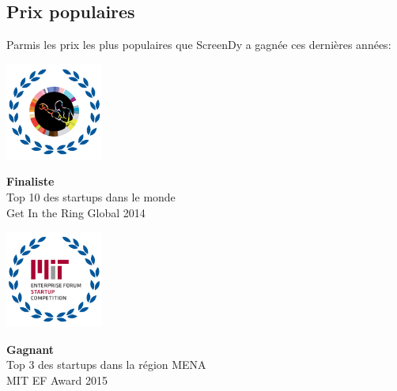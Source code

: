 \documentclass[12pt,a4paper]{report}
\begin{document}
		\subsection{Prix populaires}
Parmis les prix les plus populaires que ScreenDy a gagnée ces dernières années:\\
		\newline
		\begin{minipage}{0.5\textwidth}

		\begin{flushleft}
		\includegraphics[width=3.2cm,height=3.2cm]{graphics/10ww.png}\\
		\begin{flushleft}
		 { \scriptsize  \textbf{Finaliste} \\[0.2cm]Top 10 des startups dans le monde\\Get In the Ring Global 2014}

		\end{flushleft}

		 

		\end{flushleft}

		\end{minipage}
	\begin{minipage}{0.5\textwidth}

		\begin{flushleft}
		\includegraphics[width=3.2cm,height=3.2cm]{graphics/mit.png}\\
		\begin{flushleft}
		 { \scriptsize  \textbf{Gagnant} \\[0.2cm]Top 3 des startups dans la région MENA\\MIT EF Award 2015}

		\end{flushleft}

		 

		\end{flushleft}

		\end{minipage}
		
\end{document}

